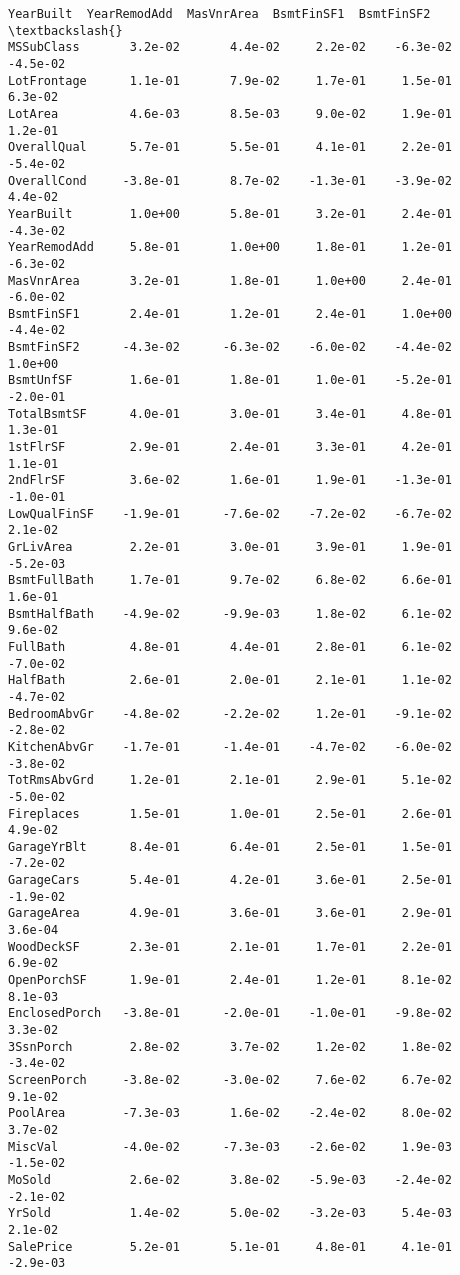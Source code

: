 \documentclass[11pt]{article}
\begin{document}
\begin{Verbatim}[commandchars=\\\{\}]
               YearBuilt  YearRemodAdd  MasVnrArea  BsmtFinSF1  BsmtFinSF2  \textbackslash{}
MSSubClass       3.2e-02       4.4e-02     2.2e-02    -6.3e-02    -4.5e-02   
LotFrontage      1.1e-01       7.9e-02     1.7e-01     1.5e-01     6.3e-02   
LotArea          4.6e-03       8.5e-03     9.0e-02     1.9e-01     1.2e-01   
OverallQual      5.7e-01       5.5e-01     4.1e-01     2.2e-01    -5.4e-02   
OverallCond     -3.8e-01       8.7e-02    -1.3e-01    -3.9e-02     4.4e-02   
YearBuilt        1.0e+00       5.8e-01     3.2e-01     2.4e-01    -4.3e-02   
YearRemodAdd     5.8e-01       1.0e+00     1.8e-01     1.2e-01    -6.3e-02   
MasVnrArea       3.2e-01       1.8e-01     1.0e+00     2.4e-01    -6.0e-02   
BsmtFinSF1       2.4e-01       1.2e-01     2.4e-01     1.0e+00    -4.4e-02   
BsmtFinSF2      -4.3e-02      -6.3e-02    -6.0e-02    -4.4e-02     1.0e+00   
BsmtUnfSF        1.6e-01       1.8e-01     1.0e-01    -5.2e-01    -2.0e-01   
TotalBsmtSF      4.0e-01       3.0e-01     3.4e-01     4.8e-01     1.3e-01   
1stFlrSF         2.9e-01       2.4e-01     3.3e-01     4.2e-01     1.1e-01   
2ndFlrSF         3.6e-02       1.6e-01     1.9e-01    -1.3e-01    -1.0e-01   
LowQualFinSF    -1.9e-01      -7.6e-02    -7.2e-02    -6.7e-02     2.1e-02   
GrLivArea        2.2e-01       3.0e-01     3.9e-01     1.9e-01    -5.2e-03   
BsmtFullBath     1.7e-01       9.7e-02     6.8e-02     6.6e-01     1.6e-01   
BsmtHalfBath    -4.9e-02      -9.9e-03     1.8e-02     6.1e-02     9.6e-02   
FullBath         4.8e-01       4.4e-01     2.8e-01     6.1e-02    -7.0e-02   
HalfBath         2.6e-01       2.0e-01     2.1e-01     1.1e-02    -4.7e-02   
BedroomAbvGr    -4.8e-02      -2.2e-02     1.2e-01    -9.1e-02    -2.8e-02   
KitchenAbvGr    -1.7e-01      -1.4e-01    -4.7e-02    -6.0e-02    -3.8e-02   
TotRmsAbvGrd     1.2e-01       2.1e-01     2.9e-01     5.1e-02    -5.0e-02   
Fireplaces       1.5e-01       1.0e-01     2.5e-01     2.6e-01     4.9e-02   
GarageYrBlt      8.4e-01       6.4e-01     2.5e-01     1.5e-01    -7.2e-02   
GarageCars       5.4e-01       4.2e-01     3.6e-01     2.5e-01    -1.9e-02   
GarageArea       4.9e-01       3.6e-01     3.6e-01     2.9e-01     3.6e-04   
WoodDeckSF       2.3e-01       2.1e-01     1.7e-01     2.2e-01     6.9e-02   
OpenPorchSF      1.9e-01       2.4e-01     1.2e-01     8.1e-02     8.1e-03   
EnclosedPorch   -3.8e-01      -2.0e-01    -1.0e-01    -9.8e-02     3.3e-02   
3SsnPorch        2.8e-02       3.7e-02     1.2e-02     1.8e-02    -3.4e-02   
ScreenPorch     -3.8e-02      -3.0e-02     7.6e-02     6.7e-02     9.1e-02   
PoolArea        -7.3e-03       1.6e-02    -2.4e-02     8.0e-02     3.7e-02   
MiscVal         -4.0e-02      -7.3e-03    -2.6e-02     1.9e-03    -1.5e-02   
MoSold           2.6e-02       3.8e-02    -5.9e-03    -2.4e-02    -2.1e-02   
YrSold           1.4e-02       5.0e-02    -3.2e-03     5.4e-03     2.1e-02   
SalePrice        5.2e-01       5.1e-01     4.8e-01     4.1e-01    -2.9e-03   


\end{Verbatim}
\end{document}
